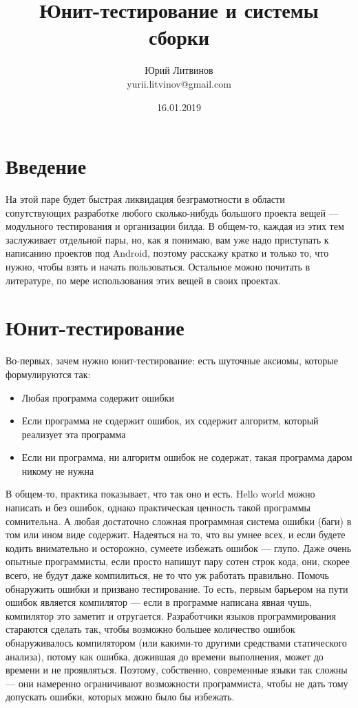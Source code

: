 \documentclass[a5paper]{article}
\title{Юнит-тестирование и системы сборки}
\author{Юрий Литвинов\\\small{yurii.litvinov@gmail.com}}
\date{16.01.2019}
\begin{document}
\maketitle
\thispagestyle{empty}

\section{Введение}

На этой паре будет быстрая ликвидация безграмотности в области сопутствующих разработке любого сколько-нибудь большого проекта вещей --- модульного тестирования и организации билда. В общем-то, каждая из этих тем заслуживает отдельной пары, но, как я понимаю, вам уже надо приступать к написанию проектов под Android, поэтому расскажу кратко и только то, что нужно, чтобы взять и начать пользоваться. Остальное можно почитать в литературе, по мере использования этих вещей в своих проектах.

\section{Юнит-тестирование}

Во-первых, зачем нужно юнит-тестирование: есть шуточные аксиомы, которые формулируются так:
\begin{itemize}
	\item Любая программа содержит ошибки
	\item Если программа не содержит ошибок, их содержит алгоритм, который реализует эта программа
	\item Если ни программа, ни алгоритм ошибок не содержат, такая программа даром никому не нужна
\end{itemize}

В общем-то, практика показывает, что так оно и есть. Hello world можно написать и без ошибок, однако практическая ценность такой программы сомнительна. А любая достаточно сложная программная система ошибки (баги) в том или ином виде содержит. Надеяться на то, что вы умнее всех, и если будете кодить внимательно и осторожно, сумеете избежать ошибок --- глупо. Даже очень опытные программисты, если просто напишут пару сотен строк кода, они, скорее всего, не будут даже компилиться, не то что уж работать правильно. Помочь обнаружить ошибки и призвано тестирование. То есть, первым барьером на пути ошибок является компилятор --- если в программе написана явная чушь, компилятор это заметит и отругается. Разработчики языков программирования стараются сделать так, чтобы возможно большее количество ошибок обнаруживалось компилятором (или какими-то другими средствами статического анализа), потому как ошибка, дожившая до времени выполнения, может до времени и не проявляться. Поэтому, собственно, современные языки так сложны --- они намеренно ограничивают возможности программиста, чтобы не дать тому допускать ошибки, которых можно было бы избежать.
\end{document}

